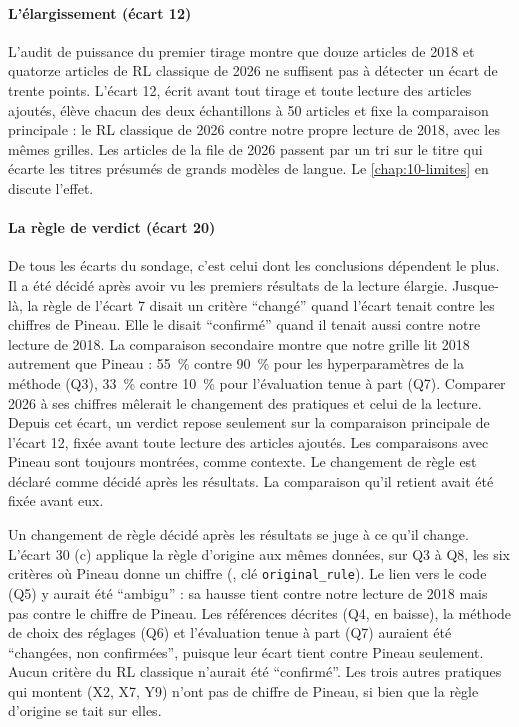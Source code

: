 \paragraph{L'élargissement (écart 12)} L'audit de puissance du premier tirage montre que douze
articles de 2018 et quatorze articles de RL classique de 2026 ne suffisent pas à détecter un écart de
trente points. L'écart 12, écrit avant tout tirage et toute lecture des articles ajoutés, élève
chacun des deux échantillons à 50 articles et fixe la comparaison principale : le RL classique de
2026 contre notre propre lecture de 2018, avec les mêmes grilles. Les articles de la file de 2026
passent par un tri sur le titre qui écarte les titres présumés de grands modèles de langue. Le
\cref{chap:10-limites} en discute l'effet.

\paragraph{La règle de verdict (écart 20)} De tous les écarts du sondage, c'est celui dont les
conclusions dépendent le plus. Il a été décidé après avoir vu les premiers résultats de la lecture élargie. Jusque-là,
la règle de l'écart 7 disait un critère \enquote{changé} quand l'écart tenait contre les chiffres de Pineau. Elle le disait \enquote{confirmé} quand il tenait aussi contre notre lecture de 2018. La comparaison
secondaire montre que notre grille lit 2018 autrement que Pineau : 55~\% contre 90~\% pour les
hyperparamètres de la méthode (Q3), 33~\% contre 10~\% pour l'évaluation tenue à part (Q7). Comparer
2026 à ses chiffres mêlerait le changement des pratiques et celui de la lecture. Depuis cet écart,
un verdict repose seulement sur la comparaison principale de l'écart 12, fixée avant toute lecture
des articles ajoutés. Les comparaisons avec Pineau sont toujours montrées, comme contexte. Le changement
de règle est déclaré comme décidé après les résultats. La comparaison qu'il retient avait été fixée
avant eux.

Un changement de règle décidé après les résultats se juge à ce qu'il change. L'écart 30 (c) applique
la règle d'origine aux mêmes données, sur Q3 à Q8, les six critères où Pineau donne un chiffre
(, clé \texttt{original\_rule}). Le lien vers le code (Q5) y aurait
été \enquote{ambigu} : sa hausse tient contre notre lecture de 2018 mais pas contre le chiffre de
Pineau. Les références décrites (Q4, en baisse), la méthode de choix des réglages (Q6) et
l'évaluation tenue à part (Q7) auraient été \enquote{changées, non confirmées}, puisque leur écart
tient contre Pineau seulement. Aucun critère du RL classique n'aurait été \enquote{confirmé}. Les
trois autres pratiques qui montent (X2, X7, Y9) n'ont pas de chiffre de Pineau, si bien que la
règle d'origine se tait sur elles.

